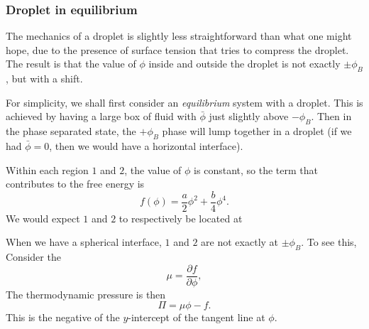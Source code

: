 \documentclass[a4paper]{article}
\begin{document}
\subsubsection*{Droplet in equilibrium}
The mechanics of a droplet is slightly less straightforward than what one might hope, due to the presence of surface tension that tries to compress the droplet. The result is that the value of $\phi$ inside and outside the droplet is not exactly $\pm \phi_B$, but with a shift.

For simplicity, we shall first consider an \emph{equilibrium} system with a droplet. This is achieved by having a large box of fluid with $\bar{\phi}$ just slightly above $-\phi_B$. Then in the phase separated state, the $+\phi_B$ phase will lump together in a droplet (if we had $\bar{\phi} = 0$, then we would have a horizontal interface).
\begin{center}
\end{center}
Within each region $1$ and $2$, the value of $\phi$ is constant, so the term that contributes to the free energy is
\[
  f (\phi) = \frac{a}{2} \phi^2 + \frac{b}{4} \phi^4.
\]
We would expect $1$ and $2$ to respectively be located at
\begin{center}
\end{center}
When we have a spherical interface, $1$ and $2$ are not exactly at $\pm \phi_B$. To see this, Consider the 
\[
  \mu = \frac{\partial f}{\partial \phi},
\]
The thermodynamic pressure is then
\[
  \Pi = \mu \phi - f.
\]
This is the negative of the $y$-intercept of the tangent line at $\phi$.
\end{document}
